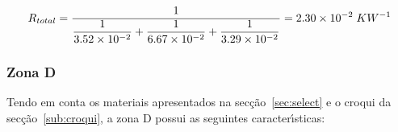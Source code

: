 \documentclass[12pt, a4paper]{article}
\begin{document}
\begin{equation}
	R_{total} =
	\dfrac{1}{
		\dfrac{1}{
			3.52 \times 10^{-2}
		} +
		\dfrac{1}{
			6.67 \times 10^{-2}
		} +
		\dfrac{1}{
			3.29 \times 10^{-2}
		}
	}
	= 2.30 \times 10^{-2} \hspace{1mm} KW^{-1}
	\label{eq:zona_c_total}
\end{equation}


\pagebreak
\subsubsection{Zona D}\label{ssub:Zona D}

Tendo em conta os materiais apresentados na sec\c{c}\~ao~\ref{sec:select} e o croqui da
sec\c{c}\~ao~\ref{sub:croqui}, a zona D possui as seguintes caracter\'{\i}sticas:
\end{document}
